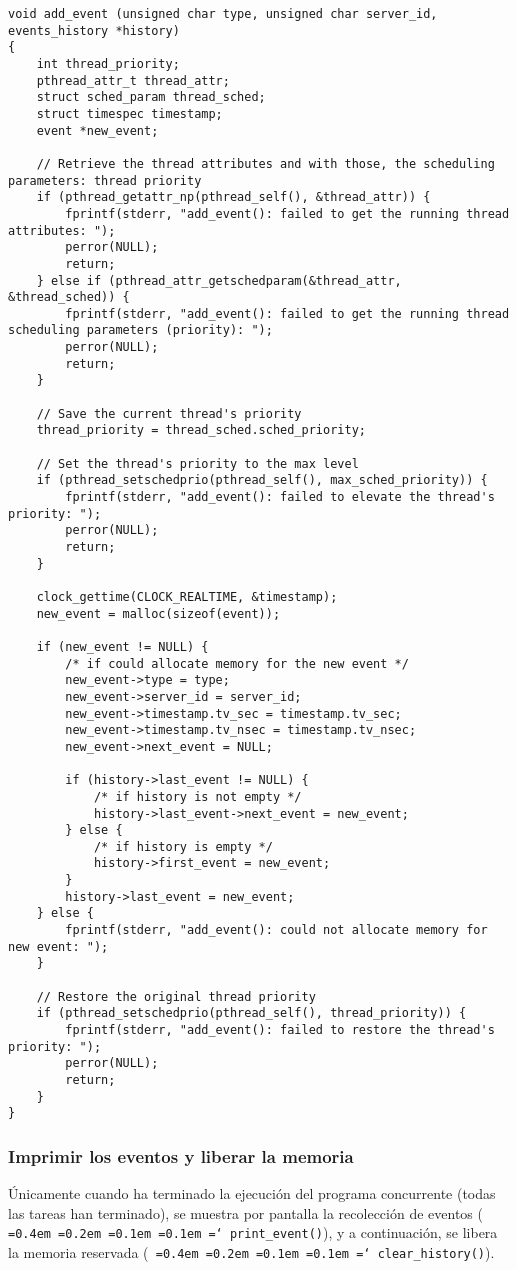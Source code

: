 \documentclass[11pt,spanish]{article}
\newcommand*\justify{%
  \fontdimen2\font=0.4em%
  \fontdimen3\font=0.2em%
  \fontdimen4\font=0.1em%
  \fontdimen7\font=0.1em%
  \hyphenchar\font=`\-%
}
\newcommand{\code}[1]{\texttt{\justify #1}}
\begin{document}
\begin{lstlisting}[style=c]
void add_event (unsigned char type, unsigned char server_id, events_history *history)
{
    int thread_priority;
    pthread_attr_t thread_attr;
    struct sched_param thread_sched;
    struct timespec timestamp;
	event *new_event;

    // Retrieve the thread attributes and with those, the scheduling parameters: thread priority 
    if (pthread_getattr_np(pthread_self(), &thread_attr)) {
        fprintf(stderr, "add_event(): failed to get the running thread attributes: ");
        perror(NULL);
        return;
    } else if (pthread_attr_getschedparam(&thread_attr, &thread_sched)) {
        fprintf(stderr, "add_event(): failed to get the running thread scheduling parameters (priority): ");
        perror(NULL);
        return;
    } 

    // Save the current thread's priority 
    thread_priority = thread_sched.sched_priority;

    // Set the thread's priority to the max level 
    if (pthread_setschedprio(pthread_self(), max_sched_priority)) {
        fprintf(stderr, "add_event(): failed to elevate the thread's priority: ");
        perror(NULL);
        return;
    }

   	clock_gettime(CLOCK_REALTIME, &timestamp);   
	new_event = malloc(sizeof(event));

	if (new_event != NULL) {
		/* if could allocate memory for the new event */
		new_event->type = type;
		new_event->server_id = server_id;
		new_event->timestamp.tv_sec = timestamp.tv_sec;
		new_event->timestamp.tv_nsec = timestamp.tv_nsec;
		new_event->next_event = NULL;

		if (history->last_event != NULL) {
			/* if history is not empty */
			history->last_event->next_event = new_event;	
		} else {
			/* if history is empty */
			history->first_event = new_event;
		}
		history->last_event = new_event;
	} else {
        fprintf(stderr, "add_event(): could not allocate memory for new event: ");
	}

    // Restore the original thread priority 
    if (pthread_setschedprio(pthread_self(), thread_priority)) {
        fprintf(stderr, "add_event(): failed to restore the thread's priority: ");
        perror(NULL);
        return;
    }
}\end{lstlisting}

\subsubsection{Imprimir los eventos y liberar la memoria}
Únicamente cuando ha terminado la ejecución del programa concurrente (todas las 
tareas han terminado), se muestra por pantalla la recolección de eventos (\code{print\_event()}),
y a continuación, se libera la memoria reservada (\code{clear\_history()}).
\end{document}
